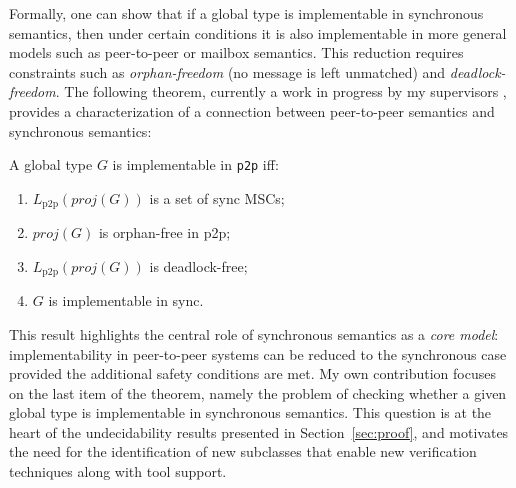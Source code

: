 Formally, one can show that if a global type is implementable in 
synchronous semantics, then under certain conditions it is also 
implementable in more general models such as peer-to-peer or mailbox 
semantics. This reduction requires constraints such as 
\emph{orphan-freedom} (no message is left unmatched) and
\emph{deadlock-freedom}.
The following theorem, currently a work in progress by my supervisors \cite{di2025realisability}, 
provides a characterization of a connection between 
peer-to-peer semantics and synchronous semantics:

\begin{theorem}
	A global type $G$ is implementable in \verb|p2p| iff:
	\begin{enumerate}
		\item $L_{\text{p2p}}(proj(G))$ is a set of sync MSCs;
		\item $proj(G)$ is orphan-free in p2p;
		\item $L_{\text{p2p}}(proj(G))$ is deadlock-free;
		\item $G$ is implementable in sync.
	\end{enumerate}
\end{theorem}

This result highlights the central role of synchronous semantics as a 
\emph{core model}: implementability in peer-to-peer systems 
can be reduced to the synchronous case provided the additional safety 
conditions are met. My own contribution focuses on the last item of the 
theorem, namely the problem of checking whether a given global type is 
implementable in synchronous semantics. This question is at the heart 
of the undecidability results presented in Section~\ref{sec:proof}, 
and motivates the need for the identification of new subclasses that 
enable new verification techniques along with tool support.

